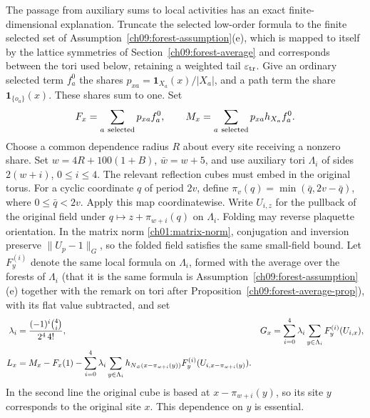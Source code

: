 The passage from auxiliary sums to local activities has an
exact finite-dimensional explanation. Truncate the selected
low-order formula to the finite selected set of Assumption~\ref{ch09:forest-assumption}(e), which is mapped to itself by the lattice symmetries of Section~\ref{ch09:forest-average} and corresponds between the tori used below, retaining a weighted tail
$\varepsilon_{\rm tr}$. Give an ordinary selected term $f_a^0$
the shares $p_{xa}=\mathbf1_{X_a}(x)/|X_a|$, and a path term
the share $\mathbf1_{\{o_a\}}(x)$. These shares sum to one.
Set
\[
 F_x=\sum_{a\ {\rm selected}}p_{xa}f_a^0,\qquad
 M_x=\sum_{a\ {\rm selected}}p_{xa}h_{X_a}f_a^0.
\]
Choose a common dependence radius $R$ about every site receiving
a nonzero share. Set $w=4R+100(1+B)$, $\bar w=w+5$, and use
auxiliary tori $\Lambda_i$ of sides $2(w+i)$, $0\le i\le4$.
The relevant reflection cubes must embed in the original torus.
For a cyclic coordinate $q$ of period $2v$, define
$\pi_v(q)=\min(\bar q,2v-\bar q)$, where $0\le\bar q<2v$.
Apply this map coordinatewise. Write $U_{i,z}$ for the pullback of
the original field under $q\mapsto z+\pi_{w+i}(q)$ on $\Lambda_i$.
Folding may reverse plaquette orientation. In the matrix norm
\eqref{ch01:matrix-norm}, conjugation and inversion preserve
$\|U_p-1\|_G$, so the folded field satisfies the same small-field bound.
Let $F_y^{(i)}$ denote the same local formula on $\Lambda_i$, formed with the average over the forests of $\Lambda_i$ (that it is the same formula is Assumption~\ref{ch09:forest-assumption}(e) together with the remark on tori after Proposition~\ref{ch09:forest-average-prop}),
with its flat value subtracted, and set
\begin{align}
 \lambda_i&=\frac{(-1)^i\binom4i}{2^4\,4!},&
 G_x&=\sum_{i=0}^4\lambda_i\sum_{y\in\Lambda_i}
                              F_y^{(i)}(U_{i,x}),\notag\\
 L_x&=M_x-F_x(1)-
   \sum_{i=0}^4\lambda_i\sum_{y\in\Lambda_i}
       h_{N_{\bar w}(x-\pi_{w+i}(y))}
                      F_y^{(i)}(U_{i,x-\pi_{w+i}(y)}).
 \label{ch09:localization}
\end{align}
In the second line the original cube is based at
$x-\pi_{w+i}(y)$, so its site
$y$ corresponds to the original site $x$.
This dependence on $y$ is essential.

